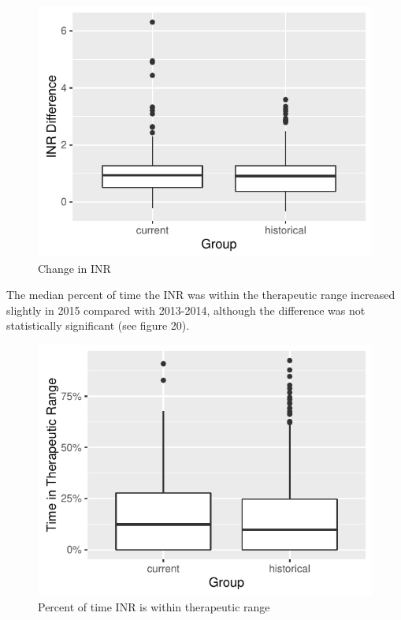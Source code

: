 \documentclass[]{article}
\begin{document}
\begin{figure}[H]
\centering
\includegraphics{warfarin_analysis_2015_files/figure-latex/inr2_hist-1.pdf}
\caption{Change in INR}
\end{figure}

The median percent of time the INR was within the therapeutic range
increased slightly in 2015 compared with 2013-2014, although the
difference was not statistically significant (see figure 20).

\begin{figure}[H]
\centering
\includegraphics{warfarin_analysis_2015_files/figure-latex/ttr_hist-1.pdf}
\caption{Percent of time INR is within therapeutic range}
\end{figure}
\end{document}
